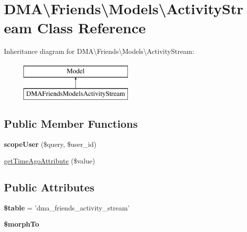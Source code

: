 \hypertarget{classDMA_1_1Friends_1_1Models_1_1ActivityStream}{\section{D\-M\-A\textbackslash{}Friends\textbackslash{}Models\textbackslash{}Activity\-Stream Class Reference}
\label{classDMA_1_1Friends_1_1Models_1_1ActivityStream}
}
Inheritance diagram for D\-M\-A\textbackslash{}Friends\textbackslash{}Models\textbackslash{}Activity\-Stream\-:\begin{figure}[H]
\begin{center}
\leavevmode
\includegraphics[height=2.000000cm]{dc/dae/classDMA_1_1Friends_1_1Models_1_1ActivityStream}
\end{center}
\end{figure}
\subsection*{Public Member Functions}
\begin{DoxyCompactItemize}
\item 
\hypertarget{classDMA_1_1Friends_1_1Models_1_1ActivityStream_ae26f2bdc09d56a8175288479289033d1}{{\bfseries scope\-User} (\$query, \$user\-\_\-id)}\label{classDMA_1_1Friends_1_1Models_1_1ActivityStream_ae26f2bdc09d56a8175288479289033d1}

\item 
\hyperlink{classDMA_1_1Friends_1_1Models_1_1ActivityStream_af1ea76e78f467dbe95233d8a0d2f386b}{get\-Time\-Ago\-Attribute} (\$value)
\end{DoxyCompactItemize}
\subsection*{Public Attributes}
\begin{DoxyCompactItemize}
\item 
\hypertarget{classDMA_1_1Friends_1_1Models_1_1ActivityStream_acc9fdaa6e30c75159bd96d96f6ca5da2}{{\bfseries \$table} = 'dma\-\_\-friends\-\_\-activity\-\_\-stream'}\label{classDMA_1_1Friends_1_1Models_1_1ActivityStream_acc9fdaa6e30c75159bd96d96f6ca5da2}

\item 
{\bfseries \$morph\-To}
\end{DoxyCompactItemize}
